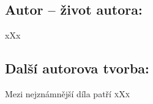 \documentclass{extarticle} %
\begin{document}




\subsection*{Autor {\ssmall -- život autora:}}
\noindent 
xXx


\subsection*{Další autorova tvorba:}
\noindent 
Mezi nejznámnější díla patří \textsc{xXx}




\end{document}
